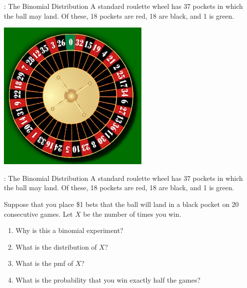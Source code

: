 \begin{frame}

  \begin{block}{\example: The Binomial Distribution}
    A standard roulette wheel has 37 pockets in which the ball may land. Of these, 18 pockets are red, 18 are black, and 1 is green.

    \begin{center}
      \includegraphics[height=.7\textheight]{roulette_wheel}
    \end{center}
  \end{block}
\end{frame}

\begin{frame}

  \begin{block}{\examplectd: The Binomial Distribution}
    A standard roulette wheel has 37 pockets in which the ball may land. Of these, 18 pockets are red, 18 are black, and 1 is green.

    \bigskip
    
    Suppose that you place \$1 bets that the ball will land in a black pocket on 20 consecutive games. Let $X$ be the number of times you win.

    \begin{enumerate}[label=\alph*),start=1]
    \item Why is this a binomial experiment?
    \item What is the distribution of $X$?
    \item What is the pmf of $X$?
    \item What is the probability that you win exactly half the games?
    \end{enumerate}
  \end{block}
\end{frame}

